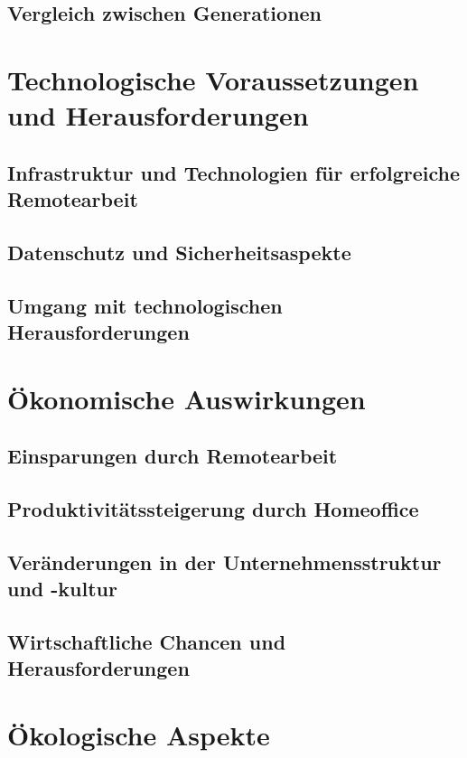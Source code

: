 \documentclass[runningheads]{llncs}
\begin{document}
\subsection{Vergleich zwischen Generationen}


\section{Technologische Voraussetzungen und Herausforderungen}

\subsection{Infrastruktur und Technologien für erfolgreiche Remotearbeit}

\subsection{Datenschutz und Sicherheitsaspekte}

\subsection{Umgang mit technologischen Herausforderungen}


\section{Ökonomische Auswirkungen}

\subsection{Einsparungen durch Remotearbeit}

\subsection{Produktivitätssteigerung durch Homeoffice}

\subsection{Veränderungen in der Unternehmensstruktur und -kultur}

\subsection{Wirtschaftliche Chancen und Herausforderungen}


\section{Ökologische Aspekte}
\end{document}
